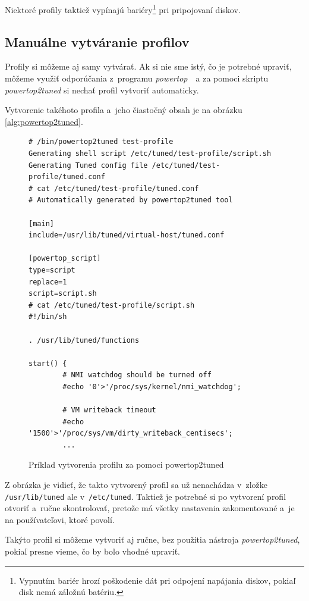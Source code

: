 Niektoré profily taktiež vypínajú bariéry\footnote{Vypnutím bariér hrozí
poškodenie dát pri odpojení napájania diskov, pokiaľ disk nemá záložnú
batériu.} pri pripojovaní diskov. 

%
%

\subsection{Manuálne vytváranie profilov}
\label{sec:powertop2tuned}

Profily si môžeme aj samy vytvárať. Ak si nie sme istý, čo je potrebné upraviť,
môžeme využiť odporúčania z~programu \emph{powertop}~\cite{powertopHomepage}~a
za pomoci skriptu \emph{powertop2tuned} si nechať profil vytvoriť automaticky.

Vytvorenie takéhoto profila a~jeho čiastočný obsah je na obrázku \ref{alg:powertop2tuned}.

\begin{figure}[H]
\begin{lstlisting}[label=alg:powertop2tuned]
# /bin/powertop2tuned test-profile
Generating shell script /etc/tuned/test-profile/script.sh
Generating Tuned config file /etc/tuned/test-profile/tuned.conf
# cat /etc/tuned/test-profile/tuned.conf
# Automatically generated by powertop2tuned tool

[main]
include=/usr/lib/tuned/virtual-host/tuned.conf

[powertop_script]
type=script
replace=1
script=script.sh
# cat /etc/tuned/test-profile/script.sh
#!/bin/sh

. /usr/lib/tuned/functions

start() {
        # NMI watchdog should be turned off
        #echo '0'>'/proc/sys/kernel/nmi_watchdog';

        # VM writeback timeout
        #echo '1500'>'/proc/sys/vm/dirty_writeback_centisecs';
        ...
\end{lstlisting}
\caption{Príklad vytvorenia profilu za pomoci powertop2tuned}
\end{figure}

Z obrázka je vidieť, že takto vytvorený profil sa už nenachádza v~zložke
\texttt{/usr/lib/tuned} ale v~\texttt{/etc/tuned}. Taktiež je potrebné si po
vytvorení profil otvoriť a~ručne skontrolovať, pretože má všetky nastavenia
zakomentované a~je na používateľovi, ktoré povolí. 

Takýto profil si môžeme vytvoriť aj ručne, bez použitia nástroja
\emph{powertop2tuned}, pokiaľ presne vieme, čo by bolo vhodné upraviť. 

